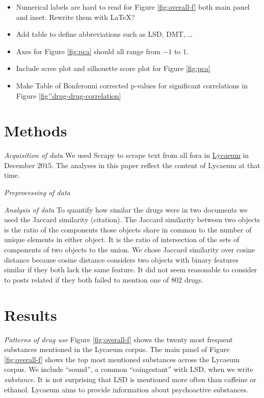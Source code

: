 \documentclass{article}
\begin{document}
 \graphicspath{{imgs/}} 
 
 
 {\color{red}
   \begin{itemize}
   	\item Numerical labels are hard to read for Figure \ref{fig:overall-f} both main panel and inset. Rewrite them with LaTeX?
   	\item Add table to define abbreviations such as LSD, DMT, \ldots
   	\item Axes for Figure \ref{fig:pca} should all range from $-1$ to $1$. 
   	\item Include scree plot and silhouette score plot for Figure \ref{fig:pca}
   	\item Make Table of Bonferonni corrected p-values for significant correlations in Figure \ref{fig''drug-drug-correlation}
   \end{itemize}
 }
 
\section*{Methods}

 \emph{Acquisition of data}
 	We used Scrapy \cite{myers2015} to scrape text from all fora in \href{http://www.lycaeum.org}{Lycaeum} in December $2015$. The analyses in this paper reflect the content of Lycaeum at that time. 
 
\emph{Preprocessing of data}	
 	
\emph{Analysis of data} To quantify how similar the drugs were in two documents we used the Jaccard similarity (citation). The Jaccard similarity between two objects is the ratio of the components those objects share in common to the number of unique elements in either object. It is the ratio of intersection of the sets of components of two objects to the union. We chose Jaccard similarity over cosine distance because cosine distance considers two objects with binary features similar if they both lack the same feature. It did not seem reasonable to consider to posts related if they both failed to mention one of $802$ drugs. 
 
\section*{Results}

\emph{Patterns of drug use}
  Figure \ref{fig:overall-f} shows the twenty most frequent substances mentioned in the Lycaeum corpus. The main panel of Figure \ref{fig:overall-f} shows the top  most mentioned substances across the Lycaeum corpus. We include ``sound'',  a common ``coingestant'' with LSD, when we write \emph{substance}.  It is not surprising that LSD is mentioned more often than caffeine or ethanol. Lycaeum aims to provide information about psychoactive substances. 
  
\end{document}
